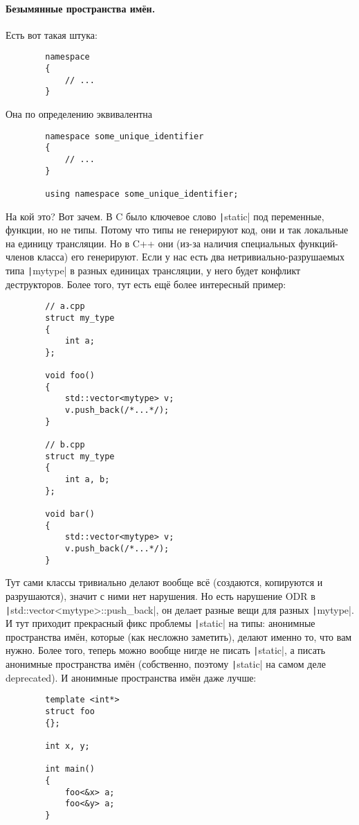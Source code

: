 \documentclass{article}
\begin{document}
    \paragraph{Безымянные пространства имён.}
    Есть вот такая штука:
    \begin{verbatim}
        namespace
        {
            // ...
        }
    \end{verbatim}
    Она по определению эквивалентна
    \begin{verbatim}
        namespace some_unique_identifier
        {
            // ...
        }

        using namespace some_unique_identifier;
    \end{verbatim}
    На кой это? Вот зачем. В C было ключевое слово \texttt|static| под переменные, функции, но не типы. Потому что типы не генерируют код, они и так локальные на единицу трансляции. Но в C++ они (из-за наличия специальных функций-членов класса) его генерируют. Если у нас есть два нетривиально-разрушаемых типа \texttt|mytype| в разных единицах трансляции, у него будет конфликт деструкторов. Более того, тут есть ещё более интересный пример:
    \begin{verbatim}
        // a.cpp
        struct my_type
        {
            int a;
        };
    
        void foo()
        {
            std::vector<mytype> v;
            v.push_back(/*...*/);
        }

        // b.cpp
        struct my_type
        {
            int a, b;
        };
        
        void bar()
        {
            std::vector<mytype> v;
            v.push_back(/*...*/);
        }
    \end{verbatim}
    Тут сами классы тривиально делают вообще всё (создаются, копируются и разрушаются), значит с ними нет нарушения. Но есть нарушение ODR в \texttt|std::vector<mytype>::push_back|, он делает разные вещи для разных \texttt|mytype|.\\
    И тут приходит прекрасный фикс проблемы \texttt|static| на типы: анонимные пространства имён, которые (как несложно заметить), делают именно то, что вам нужно. Более того, теперь можно вообще нигде не писать \texttt|static|, а писать анонимные пространства имён (собственно, поэтому \texttt|static| на самом деле deprecated). И анонимные пространства имён даже лучше:
    \begin{verbatim}
        template <int*>
        struct foo
        {};

        int x, y;

        int main()
        {
            foo<&x> a;
            foo<&y> a;
        }
    \end{verbatim}
\end{document}
